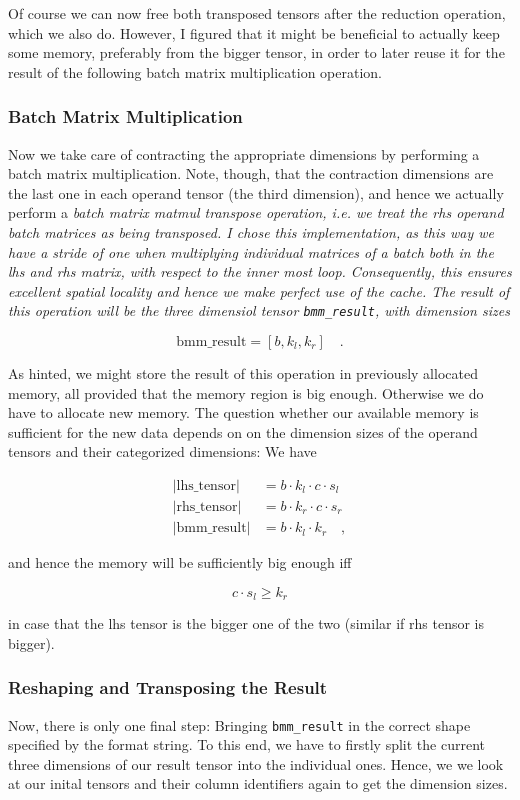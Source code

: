 \documentclass[sigconf]{acmart}
\begin{document}
Of course we can now free both transposed tensors after the reduction operation, which we also do. However, I figured that it might be beneficial to actually keep some memory, preferably from the bigger tensor, in order to later reuse it for the result of the following batch matrix multiplication operation.

\subsubsection{Batch Matrix Multiplication}
Now we take care of contracting the appropriate dimensions by performing a batch matrix multiplication. Note, though, that the contraction dimensions are the last one in each operand tensor (the third dimension), and hence we actually perform a \em batch matrix matmul transpose \em operation, i.e. we treat the rhs operand batch matrices as being transposed. I chose this implementation, as this way we have a stride of one when multiplying individual matrices of a batch both in the lhs and rhs matrix, with respect to the inner most loop. Consequently, this ensures excellent spatial locality and hence we make perfect use of the cache. The result of this operation will be the three dimensiol tensor \texttt{bmm\_result}, with dimension sizes

\[ \text{bmm\_result} = [b, k_l, k_r] \quad . \]

As hinted, we might store the result of this operation in previously allocated memory, all provided that the memory region is big enough. Otherwise we do have to allocate new memory. The question whether our available memory is sufficient for the new data depends on on the dimension sizes of the operand tensors and their categorized dimensions: We have

\begin{align*}
|\text{lhs\_tensor}| &= b \cdot k_l \cdot c \cdot s_l \\
|\text{rhs\_tensor}| &= b \cdot k_r \cdot c \cdot s_r \\
|\text{bmm\_result}| &= b \cdot k_l \cdot k_r \quad ,
\end{align*}

and hence the memory will be sufficiently big enough iff

\[ c \cdot s_l \geq k_r \]

in case that the lhs tensor is the bigger one of the two (similar if rhs tensor is bigger).


\subsubsection{Reshaping and Transposing the Result}
Now, there is only one final step: Bringing \texttt{bmm\_result} in the correct shape specified by the format string. To this end, we have to firstly split the current three dimensions of our result tensor into the individual ones. Hence, we we look at our inital tensors and their column identifiers again to get the dimension sizes.
\end{document}
